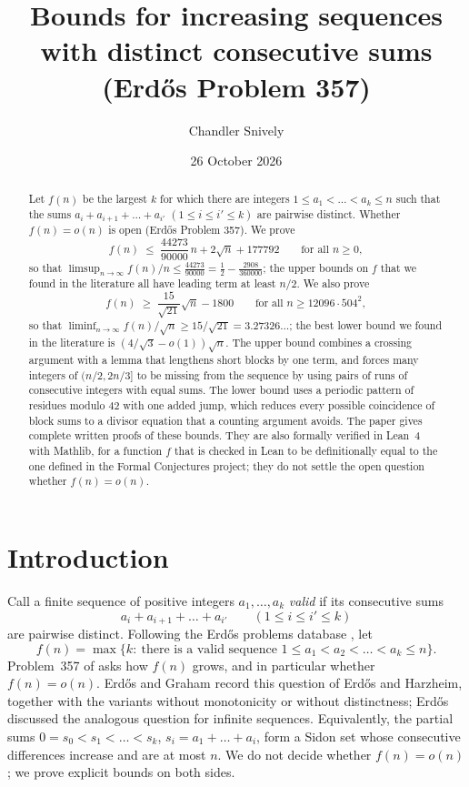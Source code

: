 \documentclass[11pt]{amsart}
\title[Bounds for sequences with distinct consecutive sums]{Bounds for increasing sequences with distinct consecutive sums
(Erd\H{o}s Problem 357)}
\author{Chandler Snively}
\date{26 October 2026}
\theoremstyle{remark}
\begin{document}
\begin{abstract}
Let $f(n)$ be the largest $k$ for which there are integers $1\le a_1<\dots<a_k\le n$ such that the sums
$a_i+a_{i+1}+\dots+a_{i'}$ $(1\le i\le i'\le k)$ are pairwise distinct. Whether $f(n)=o(n)$ is open (Erd\H{o}s Problem 357).
We prove
\[
  f(n)\;\le\;\frac{44273}{90000}\,n+2\sqrt n+177792\qquad\text{for all } n\ge0,
\]
so that $\limsup_{n\to\infty} f(n)/n\le\frac{44273}{90000}=\frac12-\frac{2908}{360000}$; the upper bounds on $f$ that we found in
the literature all have leading term at least $n/2$. We also prove
\[
  f(n)\;\ge\;\frac{15}{\sqrt{21}}\sqrt n-1800\qquad\text{for all } n\ge 12096\cdot504^2,
\]
so that $\liminf_{n\to\infty}f(n)/\sqrt n\ge 15/\sqrt{21}=3.27326\ldots$; the best lower bound we found in the literature is
$(4/\sqrt3-o(1))\sqrt n$. The upper bound combines a crossing argument with a lemma that lengthens short blocks by one term, and forces
many integers of $(n/2,2n/3]$ to be missing from the sequence by using pairs of runs of consecutive integers with equal sums. The lower
bound uses a periodic pattern of residues modulo $42$ with one added jump, which reduces every possible coincidence of block sums to a
divisor equation that a counting argument avoids. The paper gives complete written proofs of these bounds. They are also formally
verified in Lean~4 with Mathlib, for a function $f$ that is checked in Lean to be definitionally equal to the one defined in the Formal
Conjectures project; they do not settle the open question whether $f(n)=o(n)$.
\end{abstract}

\maketitle

\section{Introduction}\label{sec:intro}

Call a finite sequence of positive integers $a_1,\dots,a_k$ \emph{valid} if its consecutive sums
\[
  a_i+a_{i+1}+\dots+a_{i'} \qquad (1\le i\le i'\le k)
\]
are pairwise distinct. Following the Erd\H{o}s problems database \cite{EP357}, let
\[
  f(n)=\max\{k:\ \text{there is a valid sequence } 1\le a_1<a_2<\dots<a_k\le n\}.
\]
Problem~357 of \cite{EP357} asks how $f(n)$ grows, and in particular whether $f(n)=o(n)$. Erd\H{o}s and Graham
\cite[p.~58]{ErdosGraham1980} record this question of Erd\H{o}s and Harzheim, together with the variants without monotonicity or without
distinctness; Erd\H{o}s \cite[p.~70]{Erdos1977} discussed the analogous question for infinite sequences. Equivalently, the partial sums $0=s_0<s_1<\dots<s_k$, $s_i=a_1+\dots+a_i$, form a Sidon set whose
consecutive differences increase and are at most $n$. We do not decide whether $f(n)=o(n)$; we prove explicit bounds on both sides.
\end{document}

